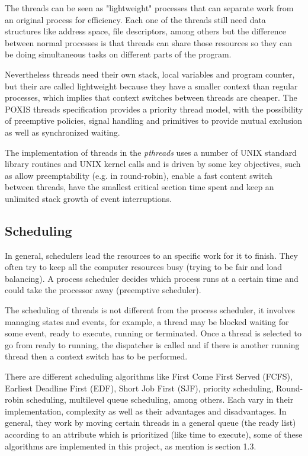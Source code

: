 \documentclass[a4paper,9pt]{article}
\begin{document}
The threads can be seen as "lightweight" processes that can separate work from an original process for efficiency. Each one of the threads still need data structures like address space, file descriptors, among others but the difference between normal processes is that threads can share those resources so they can be doing simultaneous tasks on different parts of the program. \cite{butenhof1997programming}  

Nevertheless threads need their own stack, local variables and program counter, but their are called lightweight because they have a smaller context than regular processes, which implies that context switches between threads are cheaper. The POXIS threads specification provides a priority thread model, with the possibility of preemptive policies, signal handling and primitives to provide mutual exclusion as well as synchronized waiting. \cite{mueller1993library} 

The implementation of threads in the \emph{pthreads} uses a number of UNIX standard library routines and UNIX kernel calls and is driven by some key objectives, such as allow preemptability (e.g. in round-robin), enable a fast content switch between threads, have the smallest critical section time spent and keep an unlimited stack growth of event interruptions. \cite{mueller1993library}

\subsection{Scheduling}

In general, schedulers lead the resources to an specific work for it to finish. They often try to keep all the computer resources busy (trying to be fair and load balancing). A process scheduler decides which process runs at a certain time and could take the processor away (preemptive scheduler). \cite{wikiSch}

The scheduling of threads is not different from the process scheduler, it involves managing states and events, for example, a thread may be blocked waiting for some event, ready to execute, running or terminated. Once a thread is selected to go from ready to running, the dispatcher is called and if there is another running thread then a context switch has to be performed. \cite{mueller1993library}

There are different scheduling algorithms like First Come First Served (FCFS), Earliest Deadline First (EDF), Short Job First (SJF), priority scheduling, Round-robin scheduling, multilevel queue scheduling, among others. Each vary in their implementation, complexity as well as their advantages and disadvantages. In general, they work by moving certain threads in a general queue (the ready list) according to an attribute which is prioritized (like time to execute), some of these algorithms are implemented in this project, as mention is section 1.3.
\end{document}
